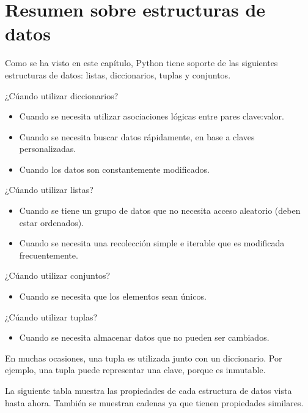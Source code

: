 \section{Resumen sobre estructuras de datos}

Como se ha visto en este capítulo, Python tiene soporte de las siguientes estructuras de datos: listas, diccionarios, tuplas y conjuntos.\smallskip

¿Cúando utilizar diccionarios?

\begin{itemize}
  \item Cuando se necesita utilizar asociaciones lógicas entre pares clave:valor.
  
  \item Cuando se necesita buscar datos rápidamente, en base a claves personalizadas.
  
  \item Cuando los datos son constantemente modificados.
  
\end{itemize}

¿Cúando utilizar listas?

\begin{itemize}
  \item Cuando se tiene un grupo de datos que no necesita acceso aleatorio (deben estar ordenados).
  
  \item Cuando se necesita una recolección simple e iterable que es modificada frecuentemente.
  
\end{itemize}

¿Cúando utilizar conjuntos?

\begin{itemize}
  \item Cuando se necesita que los elementos sean únicos.
\end{itemize}

¿Cúando utilizar tuplas?

\begin{itemize}
  \item Cuando se necesita almacenar datos que no pueden ser cambiados.
\end{itemize}

En muchas ocasiones, una tupla es utilizada junto con un diccionario. Por ejemplo, una tupla puede representar una clave, porque es inmutable.\smallskip

La siguiente tabla muestra las propiedades de cada estructura de datos vista hasta ahora. También se muestran cadenas ya que tienen propiedades similares.\medskip\medskip


